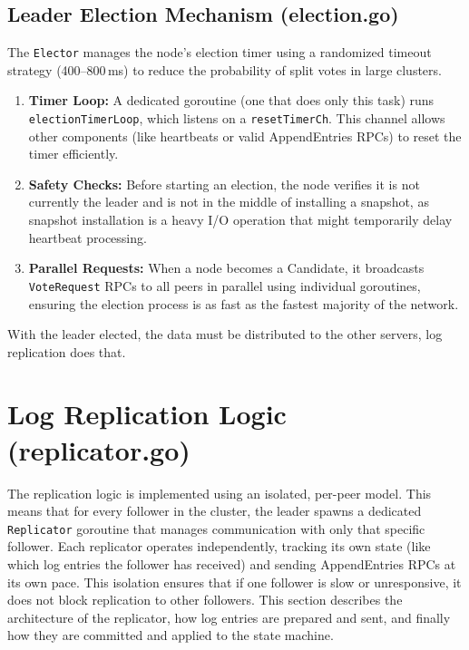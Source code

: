 \documentclass[shortabstract]{iithesis}
\begin{document}
\subsection{Leader Election Mechanism (election.go)}
The \texttt{Elector} manages the node's election timer using a randomized timeout strategy (400--800\,ms) to reduce the probability of split votes in large clusters.
\begin{enumerate}
    \item \textbf{Timer Loop:} A dedicated goroutine (one that does only this task) runs \texttt{electionTimerLoop}, which listens on a \texttt{resetTimerCh}. This channel allows other components (like heartbeats or valid AppendEntries RPCs) to reset the timer efficiently.
    \item \textbf{Safety Checks:} Before starting an election, the node verifies it is not currently the leader and is not in the middle of installing a snapshot, as snapshot installation is a heavy I/O operation that might temporarily delay heartbeat processing.
    \item \textbf{Parallel Requests:} When a node becomes a Candidate, it broadcasts \\ \texttt{VoteRequest} RPCs to all peers in parallel using individual goroutines, ensuring the election process is as fast as the fastest majority of the network.
\end{enumerate}

With the leader elected, the data must be distributed to the other servers, log replication does that.

\section{Log Replication Logic (replicator.go)}
\label{sec:log_replication}

The replication logic is implemented using an isolated, per-peer model. This means that for every follower in the cluster, the leader spawns a dedicated \texttt{Replicator} goroutine that manages communication with only that specific follower. Each replicator operates independently, tracking its own state (like which log entries the follower has received) and sending AppendEntries RPCs at its own pace. This isolation ensures that if one follower is slow or unresponsive, it does not block replication to other followers. This section describes the architecture of the replicator, how log entries are prepared and sent, and finally how they are committed and applied to the state machine.
\end{document}
